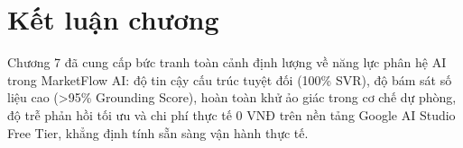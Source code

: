 \section{Kết luận chương}

Chương 7 đã cung cấp bức tranh toàn cảnh định lượng về năng lực phân hệ AI trong MarketFlow AI: độ tin cậy cấu trúc tuyệt đối (100\% SVR), độ bám sát số liệu cao (>95\% Grounding Score), hoàn toàn khử ảo giác trong cơ chế dự phòng, độ trễ phản hồi tối ưu và chi phí thực tế 0 VNĐ trên nền tảng Google AI Studio Free Tier, khẳng định tính sẵn sàng vận hành thực tế.
